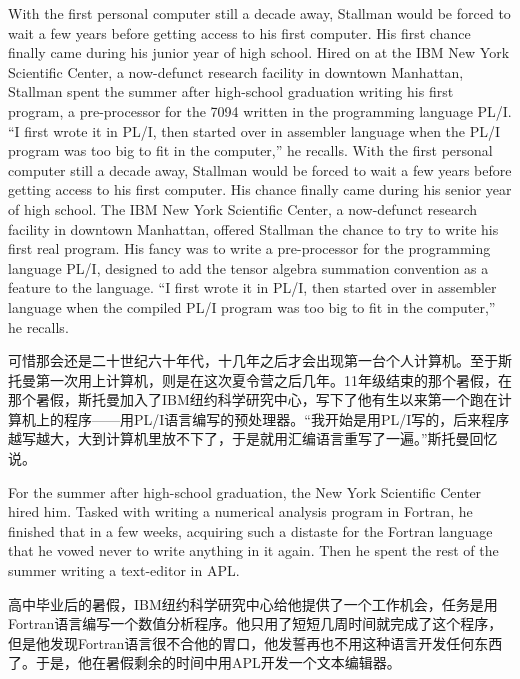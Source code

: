 \ifdefined\eng
\ifdefined\vone
With the first personal computer still a decade away, Stallman would be forced to wait a few years before getting access to his first computer. His first chance finally came during his junior year of high school. Hired on at the IBM New York Scientific Center, a now-defunct research facility in downtown Manhattan, Stallman spent the summer after high-school graduation writing his first program, a pre-processor for the 7094 written in the programming language PL/I. ``I first wrote it in PL/I, then started over in assembler language when the PL/I program was too big to fit in the computer,'' he recalls.
\fi
\ifdefined\vtwo
With the first personal computer still a decade away, Stallman would be forced to wait a few years before getting access to his first computer. His chance finally came during his senior year of high school.  The IBM New York Scientific Center, a now-defunct research facility in downtown Manhattan, offered Stallman the chance to try to write his first real program.  His fancy was to write a pre-processor for the programming language PL/I, designed to add the tensor algebra summation convention as a feature to the language. ``I first wrote it in PL/I, then started over in assembler language when the compiled PL/I program was too big to fit in the computer,'' he recalls.
\fi
\fi

\ifdefined\chs
可惜那会还是二十世纪六十年代，十几年之后才会出现第一台个人计算机。至于斯托曼第一次用上计算机，则是在这次夏令营之后几年。11年级结束的那个暑假，在那个暑假，斯托曼加入了IBM纽约科学研究中心，写下了他有生以来第一个跑在计算机上的程序——用PL/I语言编写的预处理器。``我开始是用PL/I写的，后来程序越写越大，大到计算机里放不下了，于是就用汇编语言重写了一遍。''斯托曼回忆说。
\fi

\ifdefined\vtwo
\ifdefined\eng
For the summer after high-school graduation, the New York Scientific Center hired him.  Tasked with writing a numerical analysis program in Fortran, he finished that in a few weeks, acquiring such a distaste for the Fortran language that he vowed never to write anything in it again.  Then he spent the rest of the summer writing a text-editor in APL.
\fi

\ifdefined\chs
高中毕业后的暑假，IBM纽约科学研究中心给他提供了一个工作机会，任务是用Fortran语言编写一个数值分析程序。他只用了短短几周时间就完成了这个程序，但是他发现Fortran语言很不合他的胃口，他发誓再也不用这种语言开发任何东西了。于是，他在暑假剩余的时间中用APL开发一个文本编辑器。
\fi
\fi

